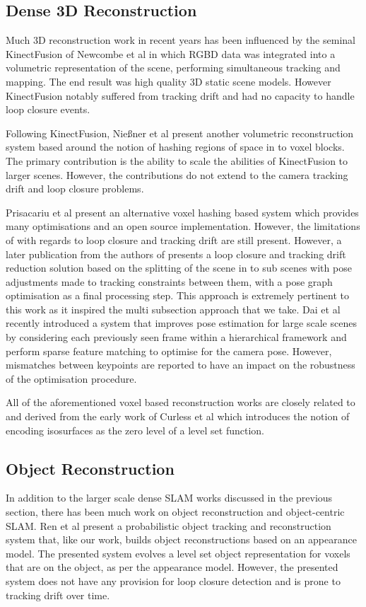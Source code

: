 \subsection{Dense 3D Reconstruction}
Much 3D reconstruction work in recent years has been influenced by the seminal KinectFusion\cite{Newcombe2011} of Newcombe et al in which
RGBD data was integrated into a volumetric representation of the scene, performing simultaneous tracking and mapping. The end result was
high quality 3D static scene models. 
However KinectFusion notably suffered from tracking drift and had no capacity to handle loop closure
events.

Following KinectFusion, Nie{\ss}ner et al present another volumetric reconstruction system\cite{Niessner2013} based around the notion of
hashing regions of space in to voxel blocks. The primary contribution is the ability to scale the abilities of KinectFusion to larger
scenes. However, the contributions do not extend to the camera tracking drift and loop closure problems.

Prisacariu et al present an alternative voxel hashing based system\cite{Prisacariu2014} which provides many optimisations and an open source 
implementation. However, the limitations of\cite{Newcombe2011,Niessner2013} with regards to loop closure and tracking drift are still present. 
However, a later publication\cite{Kahler2016} from the authors of\cite{Prisacariu2014} presents a loop closure and tracking drift reduction 
solution based on the splitting of the scene in to sub scenes with pose adjustments made to tracking constraints between them, with 
a pose graph optimisation as a final processing step. This approach is extremely pertinent to this work as it inspired the multi subsection approach 
that we take. Dai et al recently introduced a system that improves pose estimation for large scale scenes by considering each previously seen frame within a hierarchical framework and perform sparse feature matching to optimise for the camera pose. However, mismatches between keypoints are reported to have an impact on the robustness of the optimisation procedure.

All of the aforementioned voxel based reconstruction works are closely related to and derived from the early work of Curless et al \cite{Curless1996} 
which introduces the notion of encoding isosurfaces as the zero level of a level set function.

\subsection{Object Reconstruction}
In addition to the larger scale dense SLAM works discussed in the previous section, there has been much work on object reconstruction and 
object-centric SLAM. Ren et al \cite{Ren2013} present a probabilistic object tracking and reconstruction system that, like our work, builds 
object reconstructions based on an appearance model. The presented system evolves a level set object representation for voxels that 
are on the object, as per the appearance model. However, the presented system does not have any provision for loop closure detection and 
is prone to tracking drift over time.

